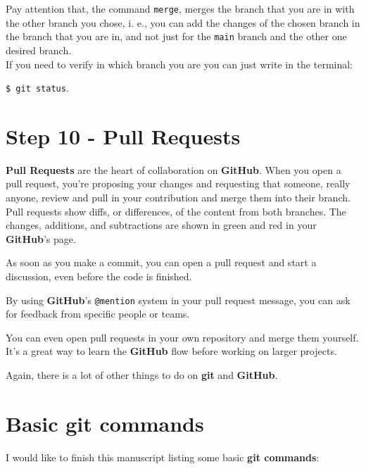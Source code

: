 \documentclass[12pt,a4paper,titlepage,brazil]{article}
\begin{document}
{Pay attention that, the command \texttt{merge}, merges the branch that you are in with the other branch you chose, i. e., you can add the changes of the chosen branch in the branch that you are in, and not just for the \texttt{main} branch and the other one desired branch.\\

If you need to verify in which branch you are you can just write in the terminal:

\texttt{\$ git status}.


\section{Step 10 - Pull Requests}

{\bf Pull Requests} are the heart of collaboration on {\bf GitHub}. When you open a pull request, you’re proposing your changes and requesting that someone, really anyone, review and pull in your contribution and merge them into their branch. Pull requests show diffs, or differences, of the content from both branches. The changes, additions, and subtractions are shown in {\color{green}green} and {\color{red}red} in your {\bf GitHub}'s page.

As soon as you make a commit, you can open a pull request and start a discussion, even before the code is finished.

By using {\bf GitHub}’s \texttt{@mention} system in your pull request message, you can ask for feedback from specific people or teams.

You can even open pull requests in your own repository and merge them yourself. It’s a great way to learn the {\bf GitHub} flow before working on larger projects.

Again, there is a lot of other things to do on {\bf git} and {\bf GitHub}.


\section{Basic git commands}

I would like to finish this manuscript listing some basic {\bf git commands}:

}
\end{document}
